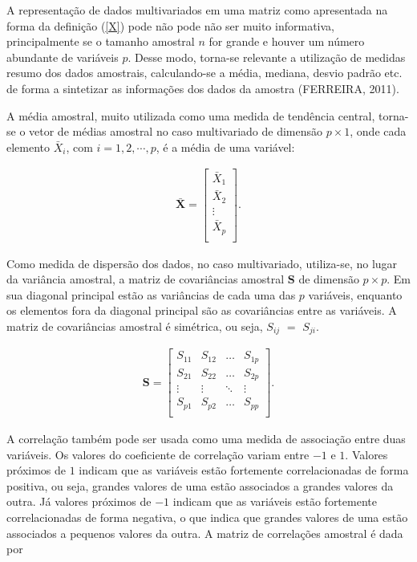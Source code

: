\documentclass[12pt, a4paper,brazil,oneside]{article}
\begin{document}
	A representação de dados multivariados em uma matriz como apresentada na forma da definição (\ref{X}) pode não pode não ser muito informativa, principalmente se o tamanho amostral $n$ for grande e houver um número abundante de variáveis $p$. Desse modo, torna-se relevante a utilização de medidas resumo dos dados amostrais, calculando-se a média, mediana, desvio padrão etc. de forma a sintetizar as informações dos dados da amostra (FERREIRA, 2011).  
	
	A média amostral, muito utilizada como uma medida de tendência central, torna-se o vetor de médias amostral no caso multivariado de dimensão $p \times 1$, onde cada elemento $\bar{X}_{i}$, com $i = 1,2,\cdots,p $, é a média de uma variável:
	
	\begin{align*}
	\boldsymbol{\bar{X}} = \left[
	\begin{array}{c}
	\bar{X}_1\\
	\bar{X}_2\\
	\vdots\\
	\bar{X}_p\\
	\end{array}
	\right].
	\end{align*}
	
	Como medida de dispersão dos dados, no caso multivariado, utiliza-se, no lugar da variância amostral, a matriz de covariâncias amostral $\boldsymbol{S}$ de dimensão $p \times p$. Em sua diagonal principal estão as variâncias de cada uma das $p$ variáveis, enquanto os elementos fora da diagonal principal são as covariâncias entre as variáveis. A matriz de covariâncias amostral é simétrica, ou seja,  $S_{ij}$ $=$ $S_{ji}$.
	
	
	\begin{align*}
	\boldsymbol{S} =
	\left[
	\begin{array}{cccc}
	S_{11} & S_{12} & \dots & S_{1p} \\
	S_{21} & S_{22} & \dots & S_{2p} \\
	\vdots & \vdots & \ddots & \vdots \\
	S_{p1} & S_{p2} & \dots & S_{pp} \\
	\end{array}
	\right].
	\end{align*}        
	
	A correlação também pode ser usada como uma medida de associação entre duas variáveis. Os valores do coeficiente de correlação variam entre $-1$ e $1$. Valores próximos de $1$ indicam que as variáveis estão fortemente correlacionadas de forma positiva, ou seja, grandes valores de uma estão associados a grandes valores da outra. Já valores próximos de $-1$ indicam que as variáveis estão fortemente correlacionadas de forma negativa, o que indica que grandes valores de uma estão associados a pequenos valores da outra. A matriz de correlações amostral é dada por 
	
\end{document}
